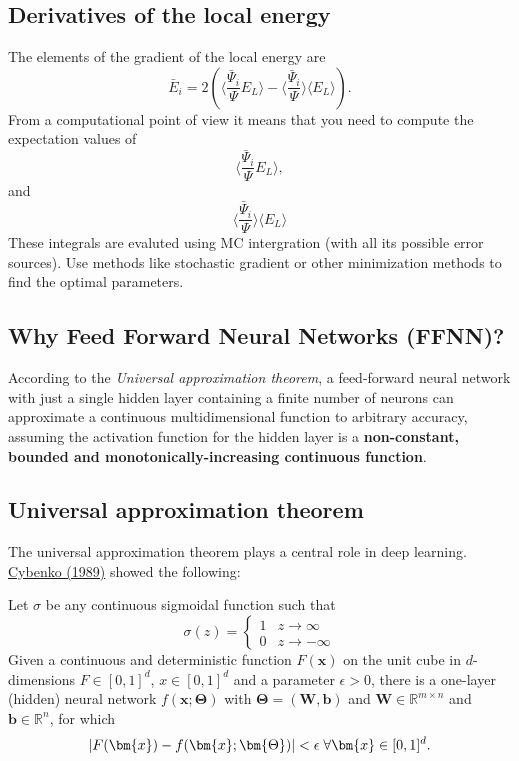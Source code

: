 \documentclass[%
oneside,                 %
final,                   %
10pt]{article}
\begin{document}
\subsection{Derivatives of the local energy}
\begin{block}{}
The elements of the gradient of the local energy are 
\[
\bar{E}_{i}= 2\left( \langle \frac{\bar{\Psi}_{i}}{\Psi}E_L\rangle -\langle \frac{\bar{\Psi}_{i}}{\Psi}\rangle\langle E_L \rangle\right).
\]
From a computational point of view it means that you need to compute the expectation values of 
\[
\langle \frac{\bar{\Psi}_{i}}{\Psi}E_L\rangle,
\]
and
\[
\langle \frac{\bar{\Psi}_{i}}{\Psi}\rangle\langle E_L\rangle
\]
These integrals are evaluted using MC intergration (with all its possible error sources). Use methods like stochastic gradient or other minimization methods to find the optimal parameters.
\end{block}

\subsection{Why Feed Forward Neural Networks (FFNN)?}

According to the \emph{Universal approximation theorem}, a feed-forward
neural network with just a single hidden layer containing a finite
number of neurons can approximate a continuous multidimensional
function to arbitrary accuracy, assuming the activation function for
the hidden layer is a \textbf{non-constant, bounded and
monotonically-increasing continuous function}.

\subsection{Universal approximation theorem}

The universal approximation theorem plays a central role in deep
learning.  \href{{https://link.springer.com/article/10.1007/BF02551274}}{Cybenko (1989)} showed
the following:

\begin{block}{}
Let $\sigma$ be any continuous sigmoidal function such that
\[
\sigma(z) = \left\{\begin{array}{cc} 1 & z\rightarrow \infty\\ 0 & z \rightarrow -\infty \end{array}\right.
\]
Given a continuous and deterministic function $F(\bm{x})$ on the unit
cube in $d$-dimensions $F\in [0,1]^d$, $x\in [0,1]^d$ and a parameter
$\epsilon >0$, there is a one-layer (hidden) neural network
$f(\bm{x};\bm{\Theta})$ with $\bm{\Theta}=(\bm{W},\bm{b})$ and $\bm{W}\in
\mathbb{R}^{m\times n}$ and $\bm{b}\in \mathbb{R}^{n}$, for which
\[
\vert F(\bm{x})-f(\bm{x};\bm{\Theta})\vert < \epsilon \hspace{0.1cm} \forall \bm{x}\in[0,1]^d.
\]

\end{block}
\end{document}
